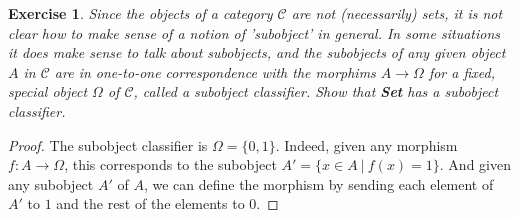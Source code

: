 \documentclass[a4paper, 11pt]{book}
\theoremstyle{plain}
\newtheorem{exercise}[theorem]{Exercise}
\theoremstyle{plain}
\begin{document}
\begin{exercise}
Since the objects of a category $\mathcal{C}$ are not (necessarily) sets, it is not clear how to make sense of a notion of 'subobject' in general. In some situations it does make sense to talk about subobjects, and the subobjects of any given object $A$ in
$\mathcal{C}$ are in one-to-one correspondence with the morphims $A\rightarrow \Omega$ for a fixed, special object $\Omega$ of $\mathcal{C}$, called a subobject classifier. Show that \textbf{Set} has a subobject classifier.
\end{exercise}
\begin{proof}
The subobject classifier is $\Omega = \{0,1\}$. Indeed, given any morphism $f:A\rightarrow \Omega$, this corresponds to the subobject $A' = \{x\in A~\vert~f(x)=1\}$. And given any subobject $A'$ of $A$, we can define the morphism by sending each element of $A'$ to $1$ and the rest of the elements to $0$.
\end{proof}
\end{document}
